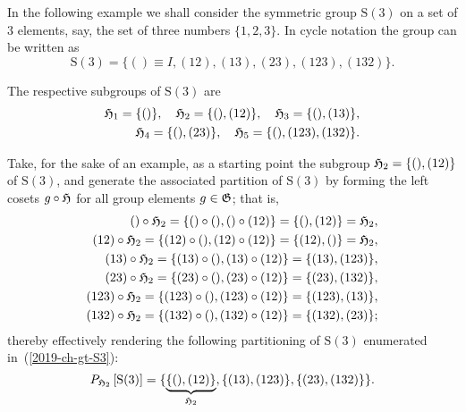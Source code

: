 {\color{blue}
\bexample
In the following example we shall consider the symmetric group $\textrm{S}(3)$
on a set of $3$ elements, say, the set of three numbers $\{1,2,3\}$.
In cycle notation
the group can be written as
\begin{equation}
\textrm{S}(3)
=
\{
()\equiv I,
(12),
(13),
(23),
(123),
(132)
\}
.
\label{2019-ch-gt-S3}
\end{equation}

The respective subgroups of $\textrm{S}(3)$
are
\begin{equation}
\begin{split}
{\frak H}_1
= \{()\},\quad
{\frak H}_2
=
\{
() ,
(12)
\},\quad
{\frak H}_3
=
\{
() ,
(13)
\},\\
{\frak H}_4
=
\{
() ,
(23)
\},\quad
{\frak H}_5
=
\{
() ,
(123),(132)
\}
.
 \end{split}
\end{equation}

Take, for the sake of an example, as a starting point the
subgroup ${\frak H}_2 = \{ () , (12) \}$ of $\textrm{S}(3)$,
and generate the associated partition of $\textrm{S}(3)$
by forming the {left cosets} $g \circ {\frak H}$
for all group elements  $g \in {\frak G}$;
that is,
\begin{equation}
\begin{split}
()\circ {\frak H}_2 = \{ ()\circ () , ()\circ (12) \}
 = \{ () , (12) \} = {\frak H}_2
,\\
(12)\circ {\frak H}_2 = \{ (12)\circ () , (12)\circ (12) \}
 = \{ (12) , () \} = {\frak H}_2
,\\
(13)\circ {\frak H}_2 = \{ (13)\circ () , (13)\circ (12) \}
 = \{ (13) , (123) \}
,\\
(23)\circ {\frak H}_2 = \{ (23)\circ () , (23)\circ (12) \}
 = \{ (23) , (132) \}
,\\
(123)\circ {\frak H}_2 = \{ (123)\circ () , (123)\circ (12) \}
 = \{ (123) , (13) \}
,\\
(132)\circ {\frak H}_2 = \{ (132)\circ () , (132)\circ (12) \}
 = \{ (132) , (23) \}
;
 \end{split}
\end{equation}
thereby effectively rendering the following partitioning of $\textrm{S}(3)$
enumerated in~(\ref{2019-ch-gt-S3}):
\begin{equation}
P_{{\frak H}_2}\left[ \textrm{S}(3) \right] =
\{
\underbrace{\{(), (12)\}}_{{\frak H}_2},
\{ (13) , (123) \},
\{ (23) , (132) \}
\}
.
\end{equation}

}

